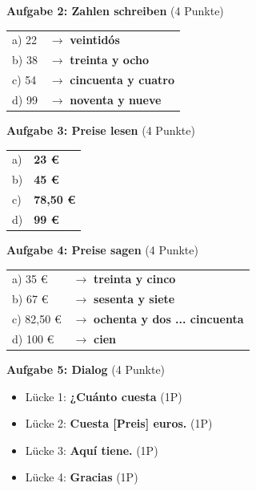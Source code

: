 \documentclass[11pt, a4paper]{article}
\newcommand{\loesung}[1]{\textcolor{loesung}{\textbf{#1}}}
\begin{document}
\vspace{1em}

\textbf{Aufgabe 2: Zahlen schreiben} (4 Punkte)

\begin{tabular}{ll}
a) 22 & $\rightarrow$ \loesung{veintidós} \\
b) 38 & $\rightarrow$ \loesung{treinta y ocho} \\
c) 54 & $\rightarrow$ \loesung{cincuenta y cuatro} \\
d) 99 & $\rightarrow$ \loesung{noventa y nueve} \\
\end{tabular}

\vspace{1em}

\textbf{Aufgabe 3: Preise lesen} (4 Punkte)

\begin{tabular}{ll}
a) & \loesung{23 €} \\
b) & \loesung{45 €} \\
c) & \loesung{78,50 €} \\
d) & \loesung{99 €} \\
\end{tabular}

\vspace{1em}

\textbf{Aufgabe 4: Preise sagen} (4 Punkte)

\begin{tabular}{ll}
a) 35 € & $\rightarrow$ \loesung{treinta y cinco} \\
b) 67 € & $\rightarrow$ \loesung{sesenta y siete} \\
c) 82,50 € & $\rightarrow$ \loesung{ochenta y dos ... cincuenta} \\
d) 100 € & $\rightarrow$ \loesung{cien} \\
\end{tabular}

\vspace{1em}

\textbf{Aufgabe 5: Dialog} (4 Punkte)

\begin{itemize}
    \item Lücke 1: \loesung{¿Cuánto cuesta} (1P)
    \item Lücke 2: \loesung{Cuesta [Preis] euros.} (1P)
    \item Lücke 3: \loesung{Aquí tiene.} (1P)
    \item Lücke 4: \loesung{Gracias} (1P)
\end{itemize}
\end{document}
